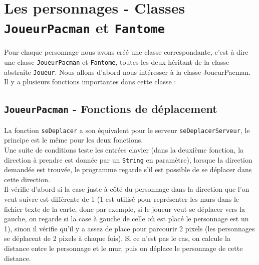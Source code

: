     \section{Les personnages - Classes \texttt{JoueurPacman} et \texttt{Fantome}}
    Pour chaque personnage nous avons créé une classe correspondante, c'est à dire une classe \texttt{JoueurPacman} et \texttt{Fantome}, toutes les deux héritant de la classe abstraite 
    \texttt{Joueur}. Nous allons d'abord nous intéresser à la classe JoueurPacman.\\
    Il y a plusieurs fonctions importantes dans cette classe :
    
      \subsection*{\texttt{JoueurPacman} - Fonctions de déplacement}
	La fonction \texttt{seDeplacer} a son équivalent pour le serveur \texttt{seDeplacerServeur}, le principe est le même pour les deux fonctions.\\
	Une suite de conditions teste les entrées clavier (dans la deuxième fonction, la direction à prendre est donnée par un \texttt{String} en paramètre), lorsque la direction demandée 
	est trouvée, le programme regarde s'il est possible de se déplacer dans cette direction. \\
	Il vérifie d'abord si la case juste à côté du personnage dans la direction que l'on veut suivre est différente de 1 (1 est utilisé pour représenter les murs dans le fichier texte de la 
	carte, donc par exemple, si le joueur veut se déplacer vers la gauche, on regarde si la case à gauche de celle où est placé le personnage est un 1), sinon il vérifie qu'il y a assez de 
	place pour parcourir 2 pixels (les personnages se déplacent de 2 pixels à chaque fois). Si ce n'est pas le cas, on calcule la distance entre le personnage et le mur, puis on déplace le 
	personnage de cette distance.
    
